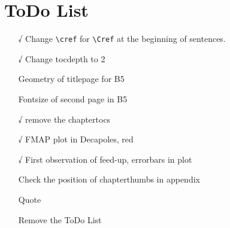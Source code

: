 \chapter*{ToDo List}

\begin{itemize}
    \tightlist
    \item[√] Change \verb|\cref| for \verb|\Cref| at the beginning of sentences.
    \item[√] Change tocdepth to 2
    \item[ ] Geometry of titlepage for B5
    \item[ ] Fontsize of second page in B5
    \item[√] remove the chaptertocs
    \item[√] FMAP plot in Decapoles, red
    \item[√] First observation of feed-up, errorbars in plot
    \item[ ] Check the position of chapterthumbs in appendix
    \item[ ] Quote
    \item[ ] Remove the ToDo List
\end{itemize}